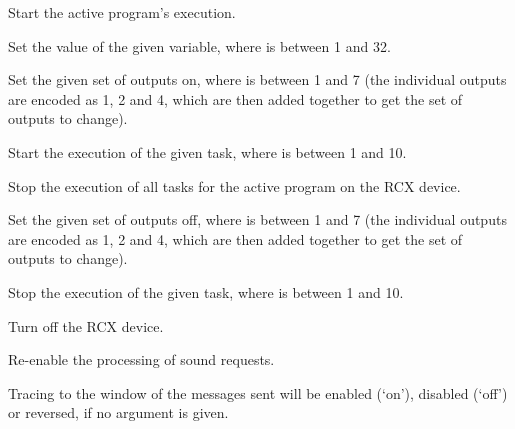   Start the active program's execution.
  
  Set the value of the given variable, where  is between 1 and 32.
  
  Set the given set of outputs on, where  is between 1 and 7
  (the individual outputs are encoded as 1, 2 and 4, which are then added together to get the set of outputs to change).
  
  Start the execution of the given task, where  is between 1 and 10.
  
  Stop the execution of all tasks for the active program on the RCX device.

  Set the given set of outputs off, where  is between 1 and 7
  (the individual outputs are encoded as 1, 2 and 4, which are then added together to get the set of outputs to change).
  
  Stop the execution of the given task, where  is between 1 and 10.
  
  Turn off the RCX device.
  
  Re-enable the processing of sound requests.

  Tracing to the \MaxName{} window of the messages sent will be enabled (`on'), disabled (`off') or reversed, if no argument is given.
  
  \objListCmdEnd

\objItemFile

\objItemMessage



%
%
